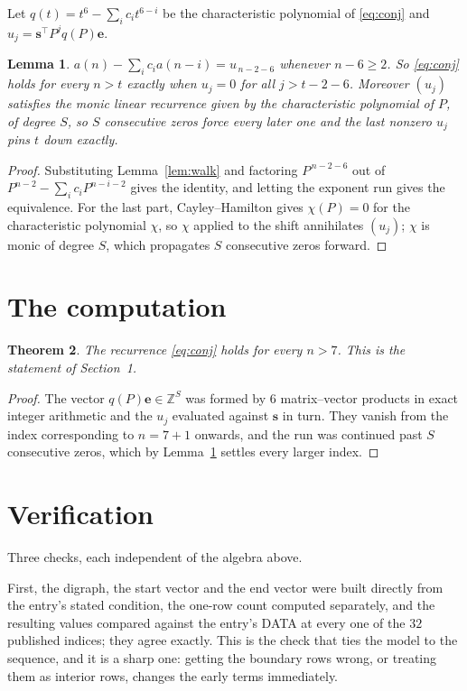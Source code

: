 \documentclass[11pt,a4paper]{article}
\theoremstyle{plain}
\newtheorem{theorem}{Theorem}
\newtheorem{lemma}[theorem]{Lemma}
\theoremstyle{definition}
\begin{document}
Let $q(t)=t^{6}-\sum_i c_i t^{6-i}$ be the characteristic polynomial of
\eqref{eq:conj} and $u_j=\mathbf{s}^{\!\top}P^{j}q(P)\mathbf{e}$.

\begin{lemma}\label{lem:crit}
$a(n)-\sum_i c_i a(n-i)=u_{\,n-2-6}$ whenever $n-6\ge2$. So \eqref{eq:conj}
holds for every $n>t$ exactly when $u_j=0$ for all $j>t-2-6$. Moreover $(u_j)$
satisfies the monic linear recurrence given by the characteristic polynomial of $P$, of
degree $S$, so $S$ consecutive zeros force every later one and the last nonzero $u_j$ pins
$t$ down exactly.
\end{lemma}

\begin{proof}
Substituting Lemma~\ref{lem:walk} and factoring $P^{\,n-2-6}$ out of
$P^{n-2}-\sum_i c_i P^{n-i-2}$ gives the identity, and letting the exponent run gives the
equivalence. For the last part, Cayley--Hamilton gives $\chi(P)=0$ for the characteristic
polynomial $\chi$, so $\chi$ applied to the shift annihilates $(u_j)$; $\chi$ is monic of
degree $S$, which propagates $S$ consecutive zeros forward.
\end{proof}

\section{The computation}

\begin{theorem}
The recurrence \eqref{eq:conj} holds for every $n>7$. This is the statement of
Section~1.
\end{theorem}

\begin{proof}
The vector $q(P)\mathbf{e}\in\mathbb{Z}^{S}$ was formed by $6$ matrix--vector
products in exact integer arithmetic and the $u_j$ evaluated against $\mathbf{s}$ in turn.
They vanish from the index corresponding to $n=7+1$ onwards, and the run was continued
past $S$ consecutive zeros, which by Lemma~\ref{lem:crit} settles every larger index.
\end{proof}

\section{Verification}

Three checks, each independent of the algebra above.

First, the digraph, the start vector and the end vector were built directly from the
entry's stated condition, the one-row count computed separately, and the resulting values
compared against the entry's DATA at every one of the $32$ published indices; they
agree exactly. This is the check that ties the model to the sequence, and it is a sharp one:
getting the boundary rows wrong, or treating them as interior rows, changes the early terms
immediately.
\end{document}
